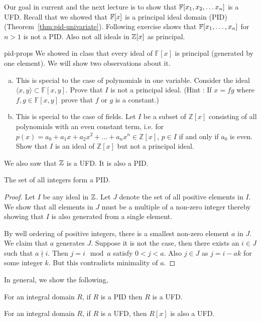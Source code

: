 Our goal in current and the next lecture is to show that ${\mathbb{F}[x_1,x_2, \ldots x_n]}$ is a UFD.
Recall that we showed that ${\mathbb{F}}[x]$ is a principal ideal domain (PID)
(Theorem~\ref{thm:pid-univariate}).  Following exercise shows that
${\mathbb{F}}[x_1,\ldots,x_n]$ for $n > 1$ is not a PID. Also not all ideals in ${\mathbb{Z}}[x]$
as principal.

\begin{exercise-prob}
\begin{show-ps2}{pid-props}
We showed in class that every ideal of $\mathbb{F}[x]$ is principal (generated by one element). We will show two observations about it.
\begin{enumerate}[(a)]
\item This is special to the case of polynomials in one variable. Consider the ideal $\langle x,y \rangle \subset \mathbb{F}[x,y]$. Prove that $I$ is not a principal ideal. (Hint : If $x = fg$ where $f,g \in \mathbb{F}[x,y]$ prove that $f$ or $g$ is a constant.)
\item This is special to the case of fields. Let $I$ be a subset of $\mathbb{Z}[x]$ consisting of all polynomials with an even constant term, i.e. for $p(x) = a_0 + a_1x+a_2x^2+\ldots+a_nx^n \in \mathbb{Z}[x]$, $p \in I$ if and only if $a_0$ is even. Show that $I$ is an ideal of $\mathbb{Z}[x]$ but not a principal ideal.
\end{enumerate}
\end{show-ps2}
\end{exercise-prob}

We also saw that ${\mathbb{Z}}$ is a UFD. It is also a PID. 
\begin{lemma} \label{lem:z-is-pid}
	The set of all integers form a PID.
\end{lemma}
\begin{proof}
	Let $I$ be any ideal in ${\mathbb{Z}}$. Let $J$ denote the set of all positive
	elements in $I$. We show that all elements in $J$ must be a multiple
	of a non-zero integer thereby showing that $I$ is also generated from a
	single element. 
	
	By well ordering of positive integers, there is a smallest non-zero
	element $a$ in $J$. We claim that $a$ generates $J$. Suppose it is not
	the case, then there exists an $i \in J$ such that $a \nmid i$. Then $
	j= i \mod a$ satisfy $0 <j <a$. Also $j \in J$ as $j = i -ak$ for some
	integer $k$. But this contradicts minimality of $a$.
\end{proof}

In general, we show the following,
\begin{theorem} \label{thm:pid-is-ufd}
	For an integral domain $R$, if $R$ is a PID then $R$ is a UFD.
\end{theorem}
\begin{theorem} \label{thm:ufd-extn}
	For an integral domain $R$, if $R$ is a UFD, then $R[x]$ is also a
	UFD.
\end{theorem}

